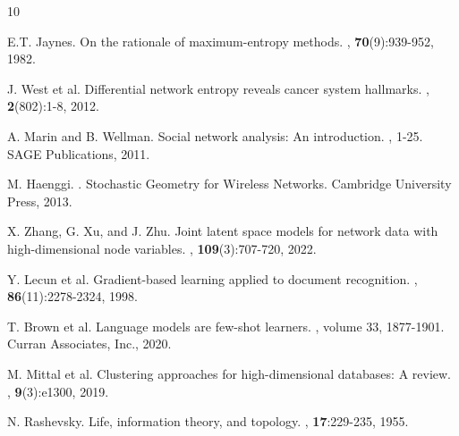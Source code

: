 \documentclass{article}
\begin{document}
\begingroup
    \renewcommand{\section}[2]{}

    \begin{thebibliography}{10}
    
    E.T. Jaynes.
    \newblock On the rationale of maximum-entropy methods.
    , \textbf{70}(9):939-952, 1982.
    
    J. West et al.
    \newblock Differential network entropy reveals cancer system hallmarks.
    , \textbf{2}(802):1-8, 2012.
    
    A. Marin and B. Wellman.
    \newblock Social network analysis: An introduction.
    , 1-25. SAGE Publications, 2011.
    
    M. Haenggi.
    .
    \newblock Stochastic Geometry for Wireless Networks. Cambridge University Press, 2013.
    
    X. Zhang, G. Xu, and J. Zhu.
    \newblock Joint latent space models for network data with high-dimensional node variables.
    , \textbf{109}(3):707-720, 2022.
    
    Y. Lecun et al.
    \newblock Gradient-based learning applied to document recognition.
    , \textbf{86}(11):2278-2324, 1998.
    
    T. Brown et al.
    \newblock Language models are few-shot learners.
    , volume 33, 1877-1901. Curran Associates, Inc., 2020.
    
    M. Mittal et al.
    \newblock Clustering approaches for high-dimensional databases: A review.
    , \textbf{9}(3):e1300, 2019.
    
    N. Rashevsky.
    \newblock Life, information theory, and topology.
    , \textbf{17}:229-235, 1955.
    

\end{thebibliography}
\end{document}
